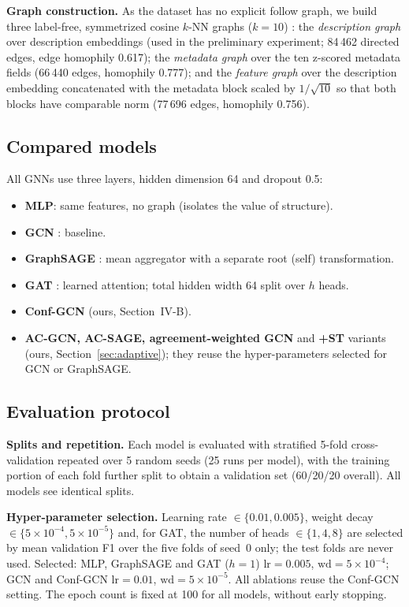 \documentclass[conference]{IEEEtran}
\begin{document}
\textbf{Graph construction.} As the dataset has no explicit follow graph, we build three label-free, symmetrized cosine $k$-NN graphs ($k=10$) \cite{zhu2003semi}: the \emph{description graph} over description embeddings (used in the preliminary experiment; 84\,462 directed edges, edge homophily 0.617); the \emph{metadata graph} over the ten z-scored metadata fields (66\,440 edges, homophily 0.777); and the \emph{feature graph} over the description embedding concatenated with the metadata block scaled by $1/\sqrt{10}$ so that both blocks have comparable norm (77\,696 edges, homophily 0.756).

\subsection{Compared models}
All GNNs use three layers, hidden dimension 64 and dropout 0.5:
\begin{itemize}
\item \textbf{MLP}: same features, no graph (isolates the value of structure).
\item \textbf{GCN} \cite{kipf2017gcn}: baseline.
\item \textbf{GraphSAGE} \cite{hamilton2017sage}: mean aggregator with a separate root (self) transformation.
\item \textbf{GAT} \cite{velickovic2018gat}: learned attention; total hidden width 64 split over $h$ heads.
\item \textbf{Conf-GCN} (ours, Section~IV-B).
\item \textbf{AC-GCN, AC-SAGE, agreement-weighted GCN} and \textbf{+ST} variants (ours, Section~\ref{sec:adaptive}); they reuse the hyper-parameters selected for GCN or GraphSAGE.
\end{itemize}

\subsection{Evaluation protocol}
\label{sec:protocol}
\textbf{Splits and repetition.} Each model is evaluated with stratified 5-fold cross-validation repeated over 5 random seeds (25 runs per model), with the training portion of each fold further split to obtain a validation set (60/20/20 overall). All models see identical splits.

\textbf{Hyper-parameter selection.} Learning rate $\in\{0.01,0.005\}$, weight decay $\in\{5\times10^{-4},5\times10^{-5}\}$ and, for GAT, the number of heads $\in\{1,4,8\}$ are selected by mean validation F1 over the five folds of seed~0 only; the test folds are never used. Selected: MLP, GraphSAGE and GAT ($h=1$) $\mathrm{lr}=0.005$, $\mathrm{wd}=5\times10^{-4}$; GCN and Conf-GCN $\mathrm{lr}=0.01$, $\mathrm{wd}=5\times10^{-5}$. All ablations reuse the Conf-GCN setting. The epoch count is fixed at 100 for all models, without early stopping.
\end{document}
